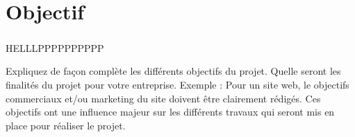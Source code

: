 \chapter{Objectif}
\paragraph{}
HELLLPPPPPPPPPP

Expliquez de façon complète les différents objectifs 
du projet. Quelle seront les finalités du projet pour 
votre entreprise. Exemple : Pour un site web, le 
objectifs commerciaux et/ou marketing du site doivent 
être clairement rédigés. Ces objectifs ont une 
influence majeur sur les différents travaux qui 
seront mis en place pour réaliser le projet.